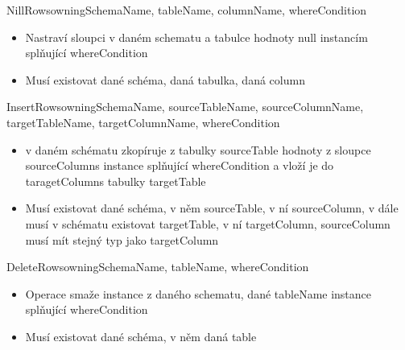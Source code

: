 \documentclass[11pt,twoside,a4paper]{book}
\begin{document}
\begin{list}{Operace :}{}
  \item NillRows{owningSchemaName, tableName, columnName, whereCondition}
  \begin{itemize}
    \item Nastraví sloupci v daném schematu a tabulce hodnoty null instancím
    splňující whereCondition
    \item Musí existovat dané schéma, daná tabulka, daná column
  \end{itemize}

  \item InsertRows{owningSchemaName, sourceTableName, sourceColumnName,
  targetTableName, targetColumnName, whereCondition}
  \begin{itemize}
    \item v daném schématu zkopíruje z tabulky sourceTable hodnoty z
    sloupce sourceColumns instance splňující whereCondition a vloží je do
    taragetColumns tabulky targetTable    
    \item Musí existovat dané schéma, v něm sourceTable, v ní sourceColumn, v
    dále musí v schématu existovat targetTable, v ní targetColumn, sourceColumn
    musí mít stejný typ jako targetColumn
  \end{itemize}

  \item DeleteRows{owningSchemaName, tableName, whereCondition}
  \begin{itemize}
    \item Operace smaže instance z daného schematu, dané tableName instance
    splňující whereCondition
    \item Musí existovat dané schéma, v něm daná table
  \end{itemize}

\end{list}
\end{document}
